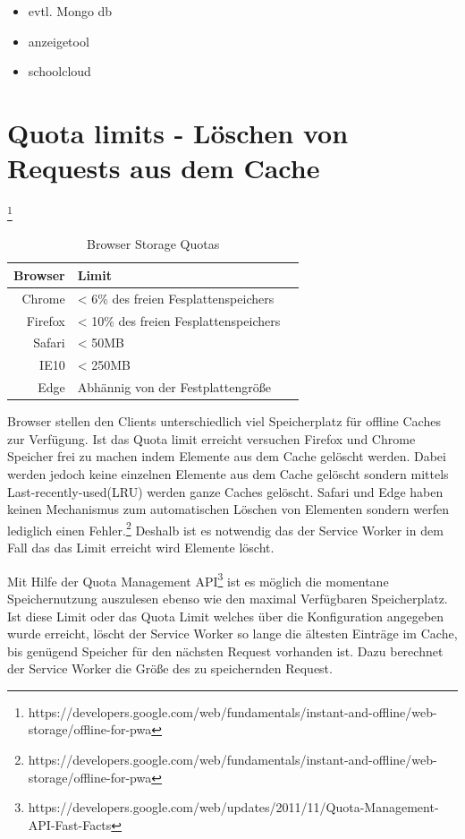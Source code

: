 \begin{itemize}
	\item 	evtl. Mongo db
	\item 	anzeigetool
	\item schoolcloud
\end{itemize}

\section{Quota limits - Löschen von Requests aus dem Cache}
\footnote{https://developers.google.com/web/fundamentals/instant-and-offline/web-storage/offline-for-pwa}
\begin{table}[!htb]
	\caption{Browser Storage Quotas }
\begin{center}

	\begin{tabular}{|r|l|l|}
		\hline
		Browser	 & Limit \\ \hline
		Chrome & < 6\% des freien Fesplattenspeichers \\ \hline
		Firefox & < 10\% des freien Fesplattenspeichers \\ \hline
		Safari & < 50MB \\ \hline
		IE10 & < 250MB \\ \hline
		Edge & Abhännig von der Festplattengröße \\ 
		\hline
	\end{tabular}
\end{center}
\end{table}

Browser stellen den Clients unterschiedlich viel Speicherplatz für offline Caches zur Verfügung. Ist das Quota limit erreicht versuchen Firefox und Chrome Speicher frei zu machen indem Elemente aus dem Cache gelöscht werden. Dabei werden jedoch keine einzelnen Elemente aus dem Cache gelöscht sondern mittels Last-recently-used(LRU) werden ganze Caches gelöscht. Safari und Edge haben keinen Mechanismus zum automatischen Löschen von Elementen sondern werfen lediglich einen Fehler.\footnote{https://developers.google.com/web/fundamentals/instant-and-offline/web-storage/offline-for-pwa} Deshalb ist es notwendig das der Service Worker in dem Fall das das Limit erreicht wird Elemente löscht.

Mit Hilfe der Quota Management API\footnote{https://developers.google.com/web/updates/2011/11/Quota-Management-API-Fast-Facts} ist es möglich die momentane Speichernutzung auszulesen ebenso wie den maximal Verfügbaren Speicherplatz. Ist diese Limit oder das Quota Limit welches über die Konfiguration angegeben wurde erreicht, löscht der Service Worker so lange die ältesten Einträge im Cache, bis genügend Speicher für den nächsten Request vorhanden ist. Dazu berechnet der Service Worker die Größe des zu speichernden Request. 

